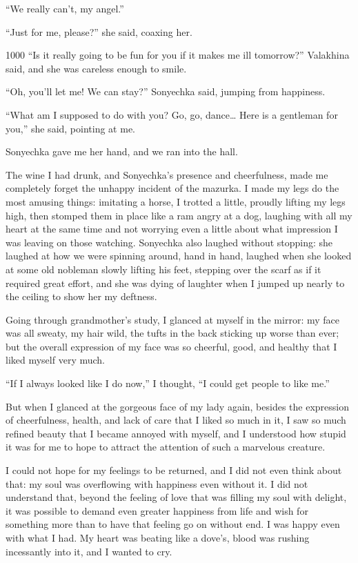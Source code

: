 ``We really can't, my angel.'' %

``Just for me, please?'' she said, coaxing her. %

\begin{tolerant}{1000}
``Is it really going to be fun for you if it makes me ill tomorrow?'' Valakhina said, and she was careless enough to smile. %
\end{tolerant}

``Oh, you'll let me! We can stay?'' Sonyechka said, jumping from happiness. %

``What am I supposed to do with you? Go, go, dance\ldots{} Here is a gentleman for you,'' she said, pointing at me. %

Sonyechka gave me her hand, and we ran into the hall.

The wine I had drunk, and Sonyechka's presence and cheerfulness, made me completely forget the unhappy incident of the mazurka. I made my legs do the most amusing things: imitating a horse, I trotted a little, proudly lifting my legs high, then stomped them in place like a ram angry at a dog, laughing with all my heart at the same time and not worrying even a little about what impression I was leaving on those watching. Sonyechka also laughed without stopping: she laughed at how we were spinning around, hand in hand, laughed when she looked at some old nobleman slowly lifting his feet, stepping over the scarf as if it required great effort, and she was dying of laughter when I jumped up nearly to the ceiling to show her my deftness.

Going through grandmother's study, I glanced at myself in the mirror: my face was all sweaty, my hair wild, the tufts in the back sticking up worse than ever; but the overall expression of my face was so cheerful, good, and healthy that I liked myself very much.

``If I always looked like I do now,'' I thought, ``I could get people to like me.'' %

But when I glanced at the gorgeous face of my lady again, besides the expression of cheerfulness, health, and lack of care that I liked so much in it, I saw so much refined beauty that I became annoyed with myself, and I understood how stupid it was for me to hope to attract the attention of such a marvelous creature.

I could not hope for my feelings to be returned, and I did not even think about that: my soul was overflowing with happiness even without it. I did not understand that, beyond the feeling of love that was filling my soul with delight, it was possible to demand even greater happiness from life and wish for something more than to have that feeling go on without end. I was happy even with what I had. My heart was beating like a dove's, blood was rushing incessantly into it, and I wanted to cry.

